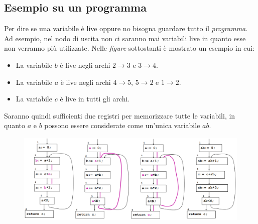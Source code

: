\documentclass[a4paper,oneside,titlepage]{book}
\begin{document}
\subsection{Esempio su un programma}
Per dire se una variabile è live oppure no bisogna guardare tutto il \textit{programma}. Ad esempio, nel nodo di uscita non ci saranno mai variabili live in quanto esse non verranno più utilizzate. Nelle \textit{figure} sottostanti è mostrato un esempio in cui:
\begin{itemize}
    \item La variabile $b$ è live negli archi $2 \rightarrow 3$ e $3 \rightarrow 4$.
    \item La variabile $a$ è live negli archi $4 \rightarrow 5$, $5 \rightarrow 2$ e $1 \rightarrow 2$.
    \item La variabile $c$ è live in tutti gli archi.
\end{itemize}
Saranno quindi sufficienti due registri per memorizzare tutte le variabili, in quanto $a$ e $b$ possono essere considerate come un'unica variabile $ab$.
\begin{figure}[htp]
	\centering
	\includegraphics[width=\textwidth, height=\textheight, keepaspectratio]{liveEx.png}
\end{figure}
\end{document}
